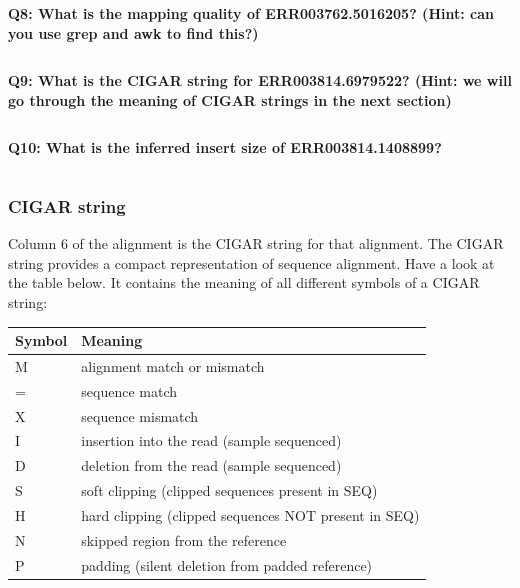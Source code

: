 \documentclass[11pt]{article}
\makeatletter
\newcommand{\boxspacing}{\kern\kvtcb@left@rule\kern\kvtcb@boxsep}
\newcommand{\prompt}[4]{
        {\ttfamily\llap{{\color{blue}\LARGE\faKeyboardO\hspace{3pt}#4}}\vspace{-\baselineskip}}
    }
\makeatother
\begin{document}
    \textbf{Q8: What is the mapping quality of ERR003762.5016205? (Hint: can
you use grep and awk to find this?)}

    \begin{tcolorbox}[breakable, size=fbox, boxrule=1pt, pad at break*=1mm,colback=cellbackground, colframe=cellborder]
\prompt{In}{incolor}{ }{\boxspacing}
\begin{Verbatim}[commandchars=\\\{\}]

\end{Verbatim}
\end{tcolorbox}

    \textbf{Q9: What is the CIGAR string for ERR003814.6979522? (Hint: we
will go through the meaning of CIGAR strings in the next section)}

    \begin{tcolorbox}[breakable, size=fbox, boxrule=1pt, pad at break*=1mm,colback=cellbackground, colframe=cellborder]
\prompt{In}{incolor}{ }{\boxspacing}
\begin{Verbatim}[commandchars=\\\{\}]

\end{Verbatim}
\end{tcolorbox}

    \textbf{Q10: What is the inferred insert size of ERR003814.1408899?}

    \begin{tcolorbox}[breakable, size=fbox, boxrule=1pt, pad at break*=1mm,colback=cellbackground, colframe=cellborder]
\prompt{In}{incolor}{ }{\boxspacing}
\begin{Verbatim}[commandchars=\\\{\}]

\end{Verbatim}
\end{tcolorbox}

    \hypertarget{cigar-string}{%
\subsubsection{CIGAR string}\label{cigar-string}}

Column 6 of the alignment is the CIGAR string for that alignment. The
CIGAR string provides a compact representation of sequence alignment.
Have a look at the table below. It contains the meaning of all different
symbols of a CIGAR string:

\begin{longtable}[]{@{}ll@{}}
\hline
Symbol & Meaning\tabularnewline
\hline
\endhead
M & alignment match or mismatch\tabularnewline
= & sequence match\tabularnewline
X & sequence mismatch\tabularnewline
I & insertion into the read (sample sequenced)\tabularnewline
D & deletion from the read (sample sequenced)\tabularnewline
S & soft clipping (clipped sequences present in SEQ)\tabularnewline
H & hard clipping (clipped sequences NOT present in SEQ)\tabularnewline
N & skipped region from the reference\tabularnewline
P & padding (silent deletion from padded reference)\tabularnewline
\hline
\end{longtable}
\end{document}

